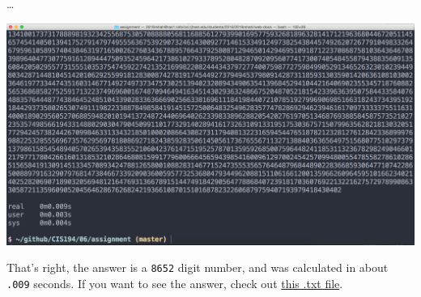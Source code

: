\documentclass[12pt]{article}
\begin{document}
	\ldots\newline{}

	\includegraphics[width=6in]{Fibonacci_ss_2}

	That's right, the answer is a \texttt{8652} digit number, and was
	calculated in about \texttt{.009} seconds. If you want to see the
	answer, check out \href{http://www.rshah.org/blog/resources/Fibonacci_answer.txt}{this .txt file}.
\end{document}
